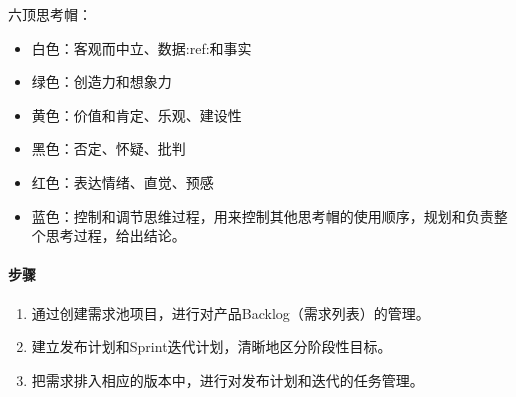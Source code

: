\documentclass[letterpaper,10pt,english]{sphinxmanual}
\begin{document}
六顶思考帽：
%
\begin{footnote}[815]\sphinxAtStartFootnote
{}
%
\end{footnote}
\begin{itemize}
\item {} 
白色：客观而中立、数据:ref:和事实

\item {} 
绿色：创造力和想象力

\item {} 
黄色：价值和肯定、乐观、建设性

\item {} 
黑色：否定、怀疑、批判

\item {} 
红色：表达情绪、直觉、预感

\item {} 
蓝色：控制和调节思维过程，用来控制其他思考帽的使用顺序，规划和负责整个思考过程，给出结论。

\end{itemize}


\paragraph{步骤}
\label{\detokenize{chapter_project/Scrum:id7}}\begin{enumerate}
%
\item {} 
通过创建需求池项目，进行对产品Backlog（需求列表）的管理。

\item {} 
建立发布计划和Sprint迭代计划，清晰地区分阶段性目标。

\item {} 
把需求排入相应的版本中，进行对发布计划和迭代的任务管理。

\end{enumerate}
\end{document}
